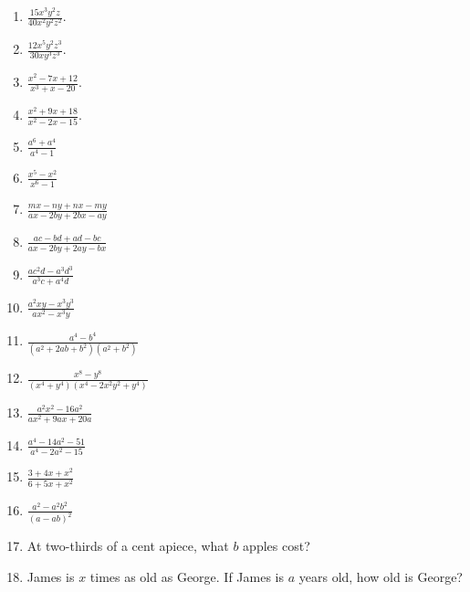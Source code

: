 \documentclass{book}
\begin{document}
\begin{enumerate}
\item $\frac{\displaystyle 15x^3y^2z}{\displaystyle 40x^2y^2z^2}$.

\item $\frac{\displaystyle 12x^5y^2z^3}{\displaystyle 30xy^3z^3}$.

\item $\displaystyle  \frac{x^2-7x+12}{x^3+x-20}$.

\item $\displaystyle \frac{x^2+9x+18}{x^2-2x-15}$.

\item $\displaystyle \frac{a^6+a^4}{a^4-1}$

\item $\displaystyle \frac{x^5-x^2}{x^6-1}$

\item $\displaystyle \frac{mx - ny + nx - my}{ax-2by+2bx-ay}$

\item $\displaystyle \frac{ac-bd+ad-bc}{ax-2by+2ay-bx}$

\item $\displaystyle \frac{ac^2d-a^3d^3}{a^3c+a^4d}$

\item $\displaystyle \frac{a^2xy-x^3y^3}{ax^2-x^3y}$

\item $\displaystyle \frac{a^4-b^4}{(a^2+2ab+b^2)(a^2+b^2)}$

\item $\displaystyle \frac{x^8 -y^8}{(x^4+y^4)(x^4-2x^2y^2+y^4)}$

\item $\displaystyle \frac{a^2x^2-16a^2}{ax^2+9ax+20a}$

\item $\displaystyle \frac{a^4-14a^2-51}{a^4-2a^2-15}$

\item $\displaystyle \frac{3+4x+x^2}{6+5x+x^2}$

\item $\displaystyle \frac{a^2-a^2b^2}{(a-ab)^2}$

\item At two-thirds of a cent apiece, what $b$ apples cost?

\item James is $x$ times as old as George. If James is $a$ years
old, how old is George?
\end{enumerate}
\end{document}
